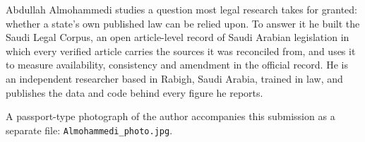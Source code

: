 \documentclass[11pt]{article}
\begin{document}
Abdullah Almohammedi studies a question most legal research takes for granted: whether a state's own published law can be relied upon. To answer it he built the Saudi Legal Corpus, an open article-level record of Saudi Arabian legislation in which every verified article carries the sources it was reconciled from, and uses it to measure availability, consistency and amendment in the official record. He is an independent researcher based in Rabigh, Saudi Arabia, trained in law, and publishes the data and code behind every figure he reports.

\vspace{1em}

\noindent A passport-type photograph of the author accompanies this
submission as a separate file: \texttt{Almohammedi\_photo.jpg}.
\end{document}
